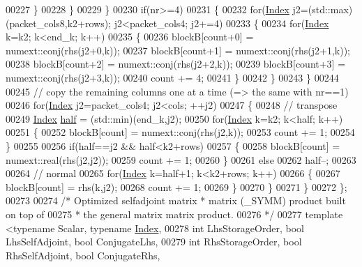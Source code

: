 \begin{DoxyCode}
00227         \}
00228       \}
00229     \}
00230     \textcolor{keywordflow}{if}(nr>=4)
00231     \{
00232       \textcolor{keywordflow}{for}(\hyperlink{namespace_eigen_a62e77e0933482dafde8fe197d9a2cfde}{Index} j2=(std::max)(packet\_cols8,k2+rows); j2<packet\_cols4; j2+=4)
00233       \{
00234         \textcolor{keywordflow}{for}(\hyperlink{namespace_eigen_a62e77e0933482dafde8fe197d9a2cfde}{Index} k=k2; k<end\_k; k++)
00235         \{
00236           blockB[count+0] = numext::conj(rhs(j2+0,k));
00237           blockB[count+1] = numext::conj(rhs(j2+1,k));
00238           blockB[count+2] = numext::conj(rhs(j2+2,k));
00239           blockB[count+3] = numext::conj(rhs(j2+3,k));
00240           count += 4;
00241         \}
00242       \}
00243     \}
00244 
00245     \textcolor{comment}{// copy the remaining columns one at a time (=> the same with nr==1)}
00246     \textcolor{keywordflow}{for}(\hyperlink{namespace_eigen_a62e77e0933482dafde8fe197d9a2cfde}{Index} j2=packet\_cols4; j2<cols; ++j2)
00247     \{
00248       \textcolor{comment}{// transpose}
00249       \hyperlink{namespace_eigen_a62e77e0933482dafde8fe197d9a2cfde}{Index} \hyperlink{struct_eigen_1_1half}{half} = (std::min)(end\_k,j2);
00250       \textcolor{keywordflow}{for}(\hyperlink{namespace_eigen_a62e77e0933482dafde8fe197d9a2cfde}{Index} k=k2; k<half; k++)
00251       \{
00252         blockB[count] = numext::conj(rhs(j2,k));
00253         count += 1;
00254       \}
00255 
00256       \textcolor{keywordflow}{if}(half==j2 && half<k2+rows)
00257       \{
00258         blockB[count] = numext::real(rhs(j2,j2));
00259         count += 1;
00260       \}
00261       \textcolor{keywordflow}{else}
00262         half--;
00263 
00264       \textcolor{comment}{// normal}
00265       \textcolor{keywordflow}{for}(\hyperlink{namespace_eigen_a62e77e0933482dafde8fe197d9a2cfde}{Index} k=half+1; k<k2+rows; k++)
00266       \{
00267         blockB[count] = rhs(k,j2);
00268         count += 1;
00269       \}
00270     \}
00271   \}
00272 \};
00273 
00274 \textcolor{comment}{/* Optimized selfadjoint matrix * matrix (\_SYMM) product built on top of}
00275 \textcolor{comment}{ * the general matrix matrix product.}
00276 \textcolor{comment}{ */}
00277 \textcolor{keyword}{template} <\textcolor{keyword}{typename} Scalar, \textcolor{keyword}{typename} \hyperlink{namespace_eigen_a62e77e0933482dafde8fe197d9a2cfde}{Index},
00278           \textcolor{keywordtype}{int} LhsStorageOrder, \textcolor{keywordtype}{bool} LhsSelfAdjoint, \textcolor{keywordtype}{bool} ConjugateLhs,
00279           \textcolor{keywordtype}{int} RhsStorageOrder, \textcolor{keywordtype}{bool} RhsSelfAdjoint, \textcolor{keywordtype}{bool} ConjugateRhs,

\end{DoxyCode}
